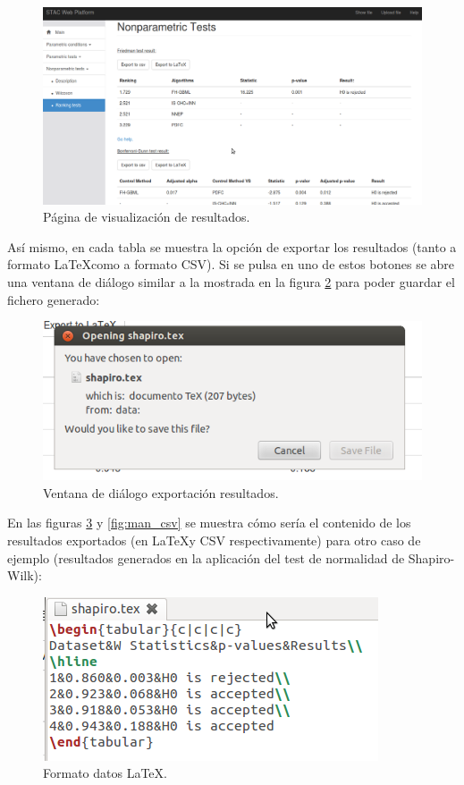 \begin{figure}[H]
\centering
\includegraphics[scale=0.4]{figuras/man_results.png}
\caption{Página de visualización de resultados.}
\label{fig:man_results}
\end{figure}

Así mismo, en cada tabla se muestra la opción de exportar los resultados (tanto a formato \LaTeX \space como a formato CSV). Si se pulsa en uno de estos botones se abre una ventana de diálogo similar a la mostrada en la figura \ref{fig:man_dialog} para poder guardar el fichero generado:

\begin{figure}[H]
\centering
\includegraphics[scale=0.6]{figuras/man_dialog.png}
\caption{Ventana de diálogo exportación resultados.}
\label{fig:man_dialog}
\end{figure}

En las figuras \ref{fig:man_latex} y \ref{fig:man_csv} se muestra cómo sería el contenido de los resultados exportados (en \LaTeX \space y CSV respectivamente) para otro caso de ejemplo (resultados generados en la aplicación del test de normalidad de Shapiro-Wilk):

\begin{figure}[H]
\centering
\includegraphics[scale=0.6]{figuras/man_latex.png}
\caption{Formato datos \LaTeX.}
\label{fig:man_latex}
\end{figure}

